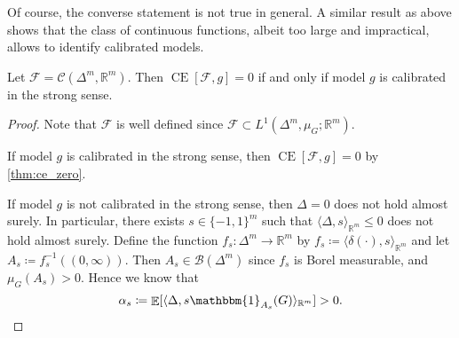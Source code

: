 \documentclass{article}
\DeclareMathOperator{\Expect}{\mathbb{E}}
\DeclareMathOperator{\measure}{CE}
\begin{document}
Of course, the converse statement is not true in general. A similar result as
above shows that the class of continuous functions, albeit too large and
impractical, allows to identify calibrated models.

\begin{theorem}\label{thm:ce_continuous}
  Let $\mathcal{F} = \mathcal{C}(\Delta^m, \mathbb{R}^m)$. Then
  $\measure[\mathcal{F}, g] = 0$ if and only if model $g$ is calibrated in the
  strong sense.
\end{theorem}

\begin{proof}
  Note that $\mathcal{F}$ is well defined since
  $\mathcal{F} \subset L^1(\Delta^m, \mu_G; \mathbb{R}^m)$.

  If model $g$ is calibrated in the strong sense, then
  $\measure[\mathcal{F}, g] = 0$ by \cref{thm:ce_zero}.

  If model $g$ is not calibrated in the strong sense, then $\Delta = 0$ does not
  hold almost surely. In particular, there exists $s \in \{-1,1\}^m$ such that
  $\langle \Delta, s\rangle_{\mathbb{R}^m} \leq 0$ does not hold almost surely.
  Define the function $f_s \colon \Delta^m \to \mathbb{R}^m$ by
  $f_s \coloneqq \langle \delta(\cdot), s \rangle_{\mathbb{R}^m}$ and let
  $A_s \coloneqq f_s^{-1}((0, \infty))$. Then $A_s \in \mathcal{B}(\Delta^m)$
  since $f_s$ is Borel measurable, and $\mu_G(A_s) > 0$. Hence we know that
  \begin{equation*}
    \alpha_s \coloneqq \Expect[\langle \Delta, s\mathbbm{1}_{A_s}(G) \rangle_{\mathbb{R}^m}] > 0.
  \end{equation*}


\end{proof}
\end{document}
